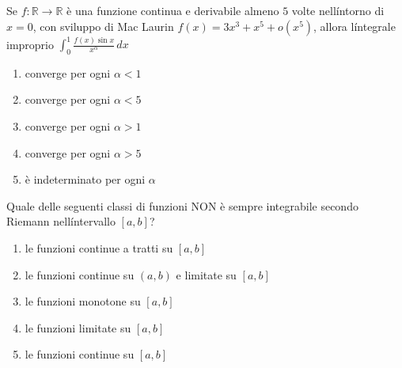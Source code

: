 \begin{quiz}
Se $f:\mathbb R\to\mathbb R$ \`e una funzione continua e derivabile almeno $5$ volte nell\'intorno di $x=0$, con sviluppo di Mac Laurin $f(x)=3x^3+x^5+o(x^5)$, allora l\'integrale improprio $\displaystyle\int_0^1\frac{f(x)\sin x}{x^\alpha}\,dx$
\begin{enumerate}
\item converge per ogni $\alpha<1$
\item converge per ogni $\alpha<5$
\item converge per ogni $\alpha>1$
\item converge per ogni $\alpha>5$
\item \`e indeterminato per ogni $\alpha$
\end{enumerate}
\end{quiz}

\begin{quiz}
Quale delle seguenti classi di funzioni NON \`e sempre integrabile secondo Riemann nell\'intervallo $[a,b]$?
\begin{enumerate}
\item le funzioni continue a tratti su $[a,b]$
\item le funzioni continue su $(a,b)$ e limitate su $[a,b]$
\item le funzioni monotone su $[a,b]$
\item le funzioni limitate su $[a,b]$
\item le funzioni continue su $[a,b]$
\end{enumerate}
\end{quiz}

